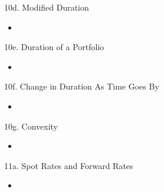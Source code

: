 \begin{CHPT_SUMM_AUTO}[label = {L.-10d}]{10d. Modified Duration}
	\begin{itemize}
		\item	
	\end{itemize}
\end{CHPT_SUMM_AUTO}

\begin{CHPT_SUMM_AUTO}[label = {L.-10e}]{10e. Duration of a Portfolio}
	\begin{itemize}
		\item	
	\end{itemize}
\end{CHPT_SUMM_AUTO}

\begin{CHPT_SUMM_AUTO}[label = {L.-10f}]{10f. Change in Duration As Time Goes By}
	\begin{itemize}
		\item	
	\end{itemize}
\end{CHPT_SUMM_AUTO}

\begin{CHPT_SUMM_AUTO}[label = {L.-10g}]{10g. Convexity}
	\begin{itemize}
		\item	
	\end{itemize}
\end{CHPT_SUMM_AUTO}

\begin{CHPT_SUMM_AUTO}[label = {L.-11a}]{11a. Spot Rates and Forward Rates}
	\begin{itemize}
		\item	
	\end{itemize}
\end{CHPT_SUMM_AUTO}

